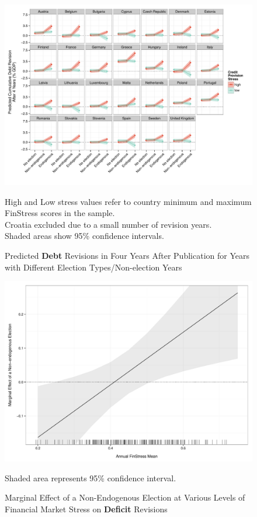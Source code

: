 \documentclass[]{article}
\begin{document}
\begin{figure}
	\caption{Predicted \textbf{Debt} Revisions in Four Years After Publication for Years with Different Election Types/Non-election Years}
    \label{country_predict_debt_required}
    \begin{center}
    	\includegraphics[scale=0.7]{figures/country_predict_required.pdf}
    \end{center}

	{\scriptsize{High and Low stress values refer to country minimum and maximum FinStress scores in the sample.\\
    Croatia excluded due to a small number of revision years.\\
    Shaded areas show 95\% confidence intervals.
}}

\end{figure}

\begin{figure}
    \caption{Marginal Effect of a Non-Endogenous Election at Various Levels of Financial Market Stress on \textbf{Deficit} Revisions}
    \label{me_finstress_non_endog_deficit}
    \begin{center}
        \includegraphics[scale=0.4]{figures/finstress_non_endog_deficit_me.pdf}
    \end{center}

	{\scriptsize{Shaded area represents 95\% confidence interval.}}

\end{figure}
\end{document}
